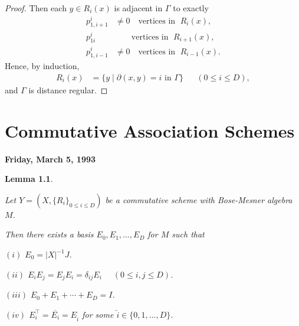 \documentclass[
]{book}
\newtheorem{lemma}{Lemma}[chapter]
\theoremstyle{definition}
\theoremstyle{definition}
\theoremstyle{definition}
\theoremstyle{definition}
\theoremstyle{remark}
\begin{document}
\begin{proof}
Then each \(y\in R_i(x)\) is adjacent in \(\Gamma\) to exactly
\begin{align}
p^i_{1,i+1} & \neq 0  \quad \text{vertices in }\; R_{i}(x),\\
p^i_{1i} & \qquad \text{vertices in }\; R_{i+1}(x),\\
p^i_{1,i-1} & \neq 0 \quad \text{vertices in }\; R_{i-1}(x).
\end{align}
Hence, by induction,
\begin{align}
R_i(x) & = \{y\mid \partial(x,y) = i \text{ in }\Gamma\} && (0\leq i\leq D),
\end{align}
and \(\Gamma\) is distance regular.

\end{proof}

\hypertarget{lec19}{%
\chapter{Commutative Association Schemes}\label{lec19}}

\textbf{Friday, March 5, 1993}

\begin{lemma}
\protect\hypertarget{lem:ei}{}\label{lem:ei}

Let \(Y = (X, \{R_i\}_{0\leq i\leq D})\) be a commutative scheme with Bose-Mesner algebra \(M\).

Then there exists a basis \(E_0, E_1, \ldots, E_D\) for \(M\) such that

\((i)\) \(E_0 = |X|^{-1}J\).

\((ii)\) \(E_iE_j = E_jE_i = \delta_{ij}E_i\) \(\quad (0\leq i,j\leq D)\).

\((iii)\) \(E_0 + E_1 + \cdots + E_D = I\).

\((iv)\) \(E_i^\top = \overline{E_i} = E_{\hat{i}}\) for some \(\hat{i}\in \{0, 1, \ldots, D\}\).

\end{lemma}
\end{document}
